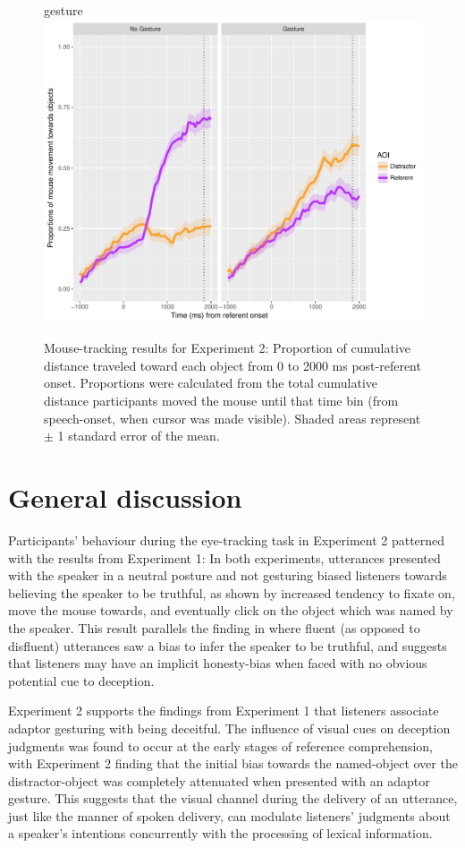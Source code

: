 \documentclass[a4paper,man,natbib]{apa6}
\begin{document}
\begin{figure}[Ht]gesture
  \centering
	\includegraphics[width=\linewidth]{./img/e8_mouset.pdf}
  \caption{Mouse-tracking results for Experiment 2: Proportion of cumulative distance traveled toward each object from 0 to 2000 ms post-referent onset. Proportions were calculated from the total cumulative distance participants moved the mouse until that time bin (from speech-onset, when cursor was made visible). Shaded areas represent $\pm$ 1 standard error of the mean.}
  \label{fig:v2_mouse}
\end{figure}

\section{General discussion}
Participants' behaviour during the eye-tracking task in Experiment 2 patterned with the results from Experiment 1:
In both experiments, utterances presented with the speaker in a neutral posture and not gesturing biased listeners towards believing the speaker to be truthful, as shown by increased tendency to fixate on, move the mouse towards, and eventually click on the object which was named by the speaker. 
This result parallels the finding in \citet{Loy2017} where fluent (as opposed to disfluent) utterances saw a bias to infer the speaker to be truthful, and suggests that listeners may have an implicit honesty-bias when faced with no obvious potential cue to deception. 

Experiment 2 supports the findings from Experiment 1 that listeners associate adaptor gesturing with being deceitful.
The influence of visual cues on deception judgments was found to occur at the early stages of reference comprehension, with Experiment 2 finding that the initial bias towards the named-object over the distractor-object was completely attenuated when presented with an adaptor gesture. 
This suggests that the visual channel during the delivery of an utterance, just like the manner of spoken delivery, can modulate listeners' judgments about a speaker's intentions concurrently with the processing of lexical information.
\end{document}
